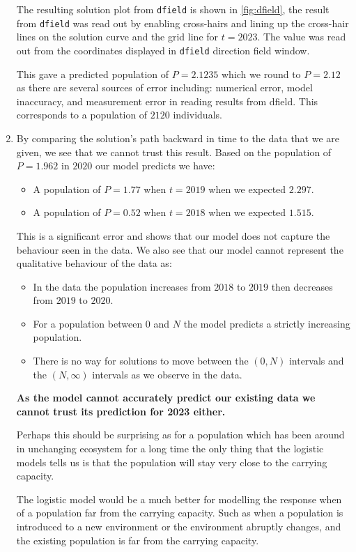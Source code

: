 \documentclass[a4paper, 11pt]{article}
\begin{document}
\begin{enumerate}[label=(\alph*)]
  The resulting solution plot from \texttt{dfield} is shown in \autoref{fig:dfield}, the result from \texttt{dfield} was read out by enabling cross-hairs and lining up the cross-hair lines on the solution curve and the grid line for $t=2023$. The value was read out from the coordinates displayed in \texttt{dfield} direction field window. 
  
  This gave a predicted population of $P=2.1235$ which we round to $P=2.12$ as there are several sources of error including: numerical error, model inaccuracy, and measurement error in reading results from dfield. This corresponds to a population of $2120$ individuals.

  \pagebreak
  \item By comparing the solution's path backward in time to the data that we are given, we see that we cannot trust this result. Based on the population of $P=1.962$ in $2020$ our model predicts we have: 
  \begin{itemize}
    \item A population of $P=1.77$ when $t=2019$ when we expected $2.297$.
    \item A population of $P=0.52$ when $t=2018$ when we expected $1.515$.
  \end{itemize}
  This is a significant error and shows that our model does not capture the behaviour seen in the data. We also see that our model cannot represent the qualitative behaviour of the data as: 
  \begin{itemize}
    \item In the data the population increases from $2018$ to $2019$ then decreases from $2019$ to $2020$. 
    \item For a population between $0$ and $N$ the model predicts a strictly increasing population.
    \item There is no way for solutions to move between the $(0,N)$ intervals and the $(N,\infty)$ intervals as we observe in the data.  
  \end{itemize}
  \textbf{As the model cannot accurately predict our existing data we cannot trust its prediction for 2023 either.}

  Perhaps this should be surprising as for a population which has been around in unchanging ecosystem for a long time the only thing that the logistic models tells us is that the population will stay very close to the carrying capacity.  
  
  The logistic model would be a much better for modelling the response when of a population far from the carrying capacity. Such as when a population is introduced to a new environment or the environment abruptly changes, and the existing population is far from the carrying capacity.  
\end{enumerate}
\end{document}
